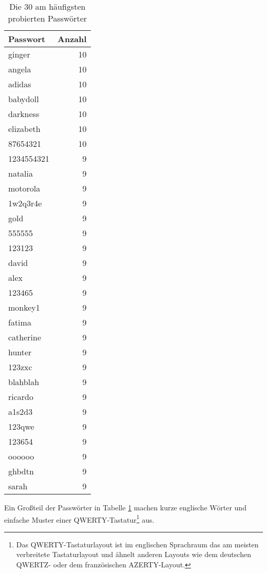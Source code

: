 \begin{table}[h]
  \begin{tabular}{ l|r }
    \textbf{Passwort} & \textbf{Anzahl}\\
    \hline
    ginger & 10 \\
    angela & 10 \\
    adidas & 10 \\
    babydoll & 10 \\
    darkness & 10 \\
    elizabeth & 10 \\
    87654321 & 10 \\
    1234554321 & 9 \\
    natalia & 9 \\
    motorola & 9 \\
    1w2q3r4e & 9 \\
    gold & 9 \\
    555555 & 9 \\
    123123 & 9 \\
    david & 9 \\
    alex & 9 \\
    123465 & 9 \\
    monkey1 & 9 \\
    fatima & 9 \\
    catherine & 9 \\
    hunter & 9 \\
    123zxc & 9 \\
    blahblah & 9 \\
    ricardo & 9 \\
    a1s2d3 & 9 \\
    123qwe & 9 \\
    123654 & 9 \\
    oooooo & 9 \\
    ghbdtn & 9 \\
    sarah & 9 \\
  \end{tabular}
  
  \caption{Die 30 am häufigsten probierten Passwörter}
  \label{tab:maxPasswords}
\end{table}

Ein Großteil der Passwörter in Tabelle \ref{tab:maxPasswords} machen kurze
englische Wörter und einfache Muster einer QWERTY-Tastatur\footnote{Das
QWERTY-Tastaturlayout ist im englischen Sprachraum das am meisten verbreitete
Tastaturlayout und ähnelt anderen Layouts wie dem deutschen QWERTZ- oder dem
französischen AZERTY-Layout.} aus.

